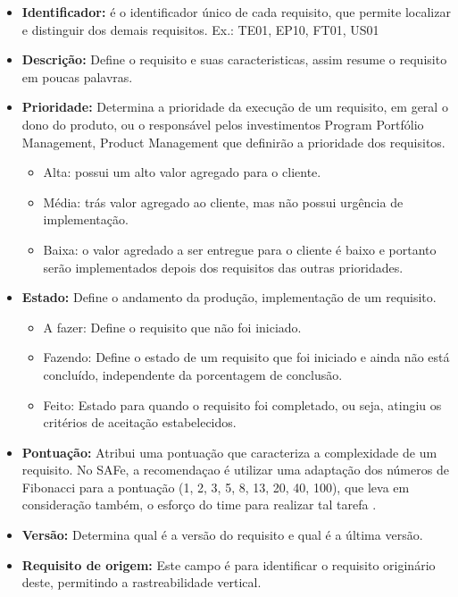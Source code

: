 \begin{itemize}
    \item \textbf{Identificador:} é o identificador único de cada requisito, que permite localizar e distinguir dos demais requisitos.
    \newline Ex.: TE01, EP10, FT01, US01
    \item \textbf{Descrição:} Define o requisito e suas caracteristicas, assim resume o requisito em poucas palavras.
    \item \textbf{Prioridade:} Determina a prioridade da execução de um requisito, em geral o dono do produto, ou o responsável pelos investimentos Program Portfólio Management, Product Management que definirão a prioridade dos requisitos.
    \begin{itemize}
        \item Alta: possui um alto valor agregado para o cliente.
        \item Média: trás valor agregado ao cliente, mas não possui urgência de implementação.
        \item Baixa: o valor agredado a ser entregue para o cliente é baixo e portanto serão implementados depois dos requisitos das outras prioridades.
    \end{itemize}
    \item \textbf{Estado:} Define o andamento da produção, implementação de um requisito.
    \begin{itemize}
        \item A fazer: Define o requisito que não foi iniciado.
        \item Fazendo: Define o estado de um requisito que foi iniciado e ainda não está concluído, independente da porcentagem de conclusão.
        \item Feito: Estado para quando o requisito foi completado, ou seja, atingiu os critérios de aceitação estabelecidos.
    \end{itemize}
    \item \textbf{Pontuação:} Atribui uma pontuação que caracteriza a complexidade de um requisito. No SAFe, a recomendaçao é utilizar uma adaptação dos números de Fibonacci para a pontuação (1, 2, 3, 5, 8, 13, 20, 40, 100), que leva em consideração também, o esforço do time para realizar tal tarefa \cite{safe}.
    \item \textbf{Versão:} Determina qual é a versão do requisito e qual é a última versão.
    \item \textbf{Requisito de origem:} Este campo é para identificar o requisito originário deste, permitindo a rastreabilidade vertical.
\end{itemize}


